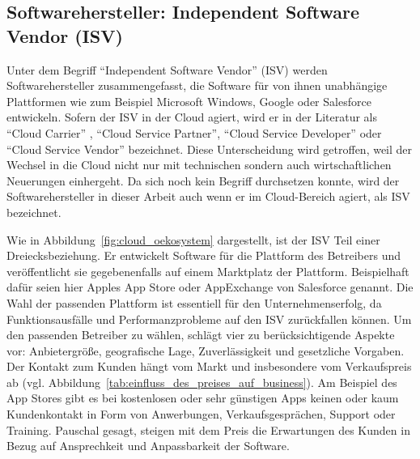 
\subsection{Softwarehersteller: Independent Software Vendor (ISV)}
\label{cha:isv}
Unter dem Begriff "`Independent Software Vendor"' (ISV) werden 
Softwarehersteller zusammengefasst, die Software für von ihnen unabhängige Plattformen wie zum 
Beispiel Microsoft Windows, Google oder Salesforce entwickeln. Sofern der ISV 
in der Cloud agiert, wird er in der Literatur als "`Cloud Carrier"'
, "`Cloud Service Partner"', 
"`Cloud Service Developer"' 
 oder "`Cloud Service 
Vendor"'  bezeichnet. Diese 
Unterscheidung wird getroffen, weil der Wechsel in die Cloud nicht nur mit 
technischen sondern auch wirtschaftlichen Neuerungen einhergeht. Da sich noch 
kein Begriff durchsetzen konnte, wird der Softwarehersteller in dieser Arbeit 
auch wenn er im Cloud-Bereich agiert, als ISV bezeichnet.



Wie in Abbildung~\ref{fig:cloud_oekosystem} dargestellt, ist der ISV Teil einer 
Dreiecksbeziehung. Er entwickelt Software für die Plattform des Betreibers und 
veröffentlicht sie gegebenenfalls auf einem Marktplatz der Plattform. 
Beispielhaft dafür seien hier Apples App Store oder AppExchange von Salesforce 
genannt. Die Wahl der passenden Plattform ist essentiell für den 
Unternehmenserfolg, da Funktionsausfälle und Performanzprobleme auf den 
ISV zurückfallen können. Um den passenden Betreiber zu wählen, schlägt 
 vier zu berücksichtigende Aspekte 
vor: Anbietergröße, geografische Lage, Zuverlässigkeit und gesetzliche 
Vorgaben. \\

Der Kontakt zum Kunden hängt vom Markt und insbesondere vom Verkaufspreis ab 
(vgl. Abbildung~\ref{tab:einfluss_des_preises_auf_business}). Am Beispiel des 
App Stores gibt es bei kostenlosen oder sehr günstigen Apps keinen oder kaum 
Kundenkontakt in Form von Anwerbungen, Verkaufsgesprächen, Support oder  
Training. Pauschal gesagt, steigen mit dem Preis die Erwartungen des 
Kunden in Bezug auf Ansprechkeit und Anpassbarkeit der Software. 

